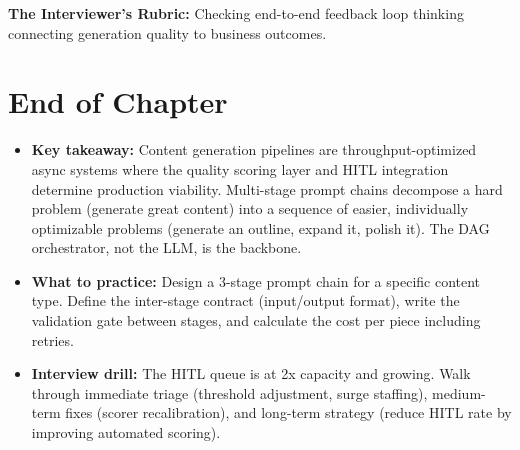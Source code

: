 \textbf{The Interviewer's Rubric:} Checking end-to-end feedback loop thinking connecting generation quality to business outcomes.

\section*{End of Chapter}

\begin{itemize}
  \item \textbf{Key takeaway:} Content generation pipelines are throughput-optimized async systems where the quality scoring layer and HITL integration determine production viability. Multi-stage prompt chains decompose a hard problem (generate great content) into a sequence of easier, individually optimizable problems (generate an outline, expand it, polish it). The DAG orchestrator, not the LLM, is the backbone.
  \item \textbf{What to practice:} Design a 3-stage prompt chain for a specific content type. Define the inter-stage contract (input/output format), write the validation gate between stages, and calculate the cost per piece including retries.
  \item \textbf{Interview drill:} The HITL queue is at 2x capacity and growing. Walk through immediate triage (threshold adjustment, surge staffing), medium-term fixes (scorer recalibration), and long-term strategy (reduce HITL rate by improving automated scoring).
\end{itemize}
